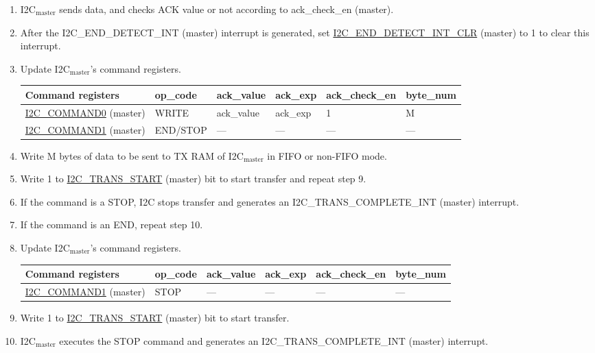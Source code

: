 \documentclass[main\_\_EN.tex]{subfiles}
\begin{document}
\begin{enumerate}
\item I2C$_\text{master}$ sends data, and checks ACK value or not according to ack\_check\_en (master).

\item After the I2C\_END\_DETECT\_INT (master) interrupt is generated, set \hyperref[fielddesc:I2CENDDETECTINTCLR]{I2C\_END\_DETECT\_INT\_CLR} (master) to 1 to clear this interrupt.
\item Update I2C$_\text{master}$'s command registers.
\begin{longtable}{ | p{4cm} | p{2cm} | p{2cm} | p{2cm} |p{2cm} | p{2cm} |}
\hline\rowcolor{lightgray}
Command registers& op\_code & ack\_value&ack\_exp&ack\_check\_en&byte\_num  \\ \hline
\hyperref[fielddesc:I2CCOMMAND0]{I2C\_COMMAND0} (master)& WRITE& ack\_value&ack\_exp&1&M  \\ \hline
\hyperref[fielddesc:I2CCOMMAND1]{I2C\_COMMAND1} (master)& END/STOP& ---&---&---&---  \\ \hline
\end{longtable} 
\item Write M bytes of data to be sent to TX RAM of I2C$_\text{master}$ in FIFO or non-FIFO mode.
\item Write 1 to \hyperref[fielddesc:I2CTRANSSTART]{I2C\_TRANS\_START} (master) bit to start transfer and repeat step 9.
\item If the command is a STOP, I2C stops transfer and generates an I2C\_TRANS\_COMPLETE\_INT (master) interrupt.
\item If the command is an END, repeat step 10.
\item Update I2C$_\text{master}$'s command registers.
\begin{longtable}{ | p{4cm} | p{2cm} | p{2cm} | p{2cm} |p{2cm} | p{2cm} |}
\hline\rowcolor{lightgray}
Command registers & op\_code & ack\_value&ack\_exp&ack\_check\_en&byte\_num  \\ \hline
\hyperref[fielddesc:I2CCOMMAND1]{I2C\_COMMAND1} (master)& STOP& ---&---&---&---  \\ \hline
\end{longtable} 
\item Write 1 to \hyperref[fielddesc:I2CTRANSSTART]{I2C\_TRANS\_START} (master) bit to start transfer.
\item I2C$_\text{master}$ executes the STOP command and generates an I2C\_TRANS\_COMPLETE\_INT (master) interrupt.

\end{enumerate}
\end{document}
